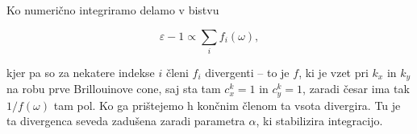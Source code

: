 \documentclass[a4paper, 12pt]{article}
\newcommand{\w}{
	\ensuremath{\omega}
}
\renewcommand{\ni}{
	\noindent
}
\begin{document}
\ni Ko numeri\v cno integriramo delamo v bistvu

\begin{equation}
	\varepsilon - 1 \propto \sum_i f_i (\w),
\end{equation}

\ni kjer pa so za nekatere indekse $i$ \v cleni $f_i$ divergenti -- to je $f$, ki je vzet pri $k_x$ in $k_y$ na robu
prve Brillouinove cone, saj sta tam $c_x^k = 1$ in $c_y^k = 1$, zaradi \v cesar ima tak $1/f(\w)$ tam pol. Ko ga pri\v stejemo
h kon\v cnim \v clenom ta vsota divergira. Tu je ta divergenca seveda zadu\v sena zaradi parametra $\alpha$, ki stabilizira
integracijo.
\end{document}
